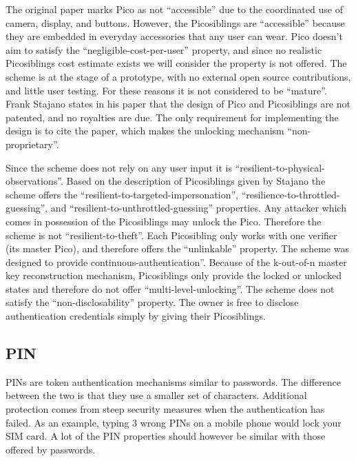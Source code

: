 	The original paper marks Pico as not ``accessible'' due to the coordinated use of camera, display, and buttons. However, the Picosiblings are ``accessible'' because they are embedded in everyday accessories that any user can wear. Pico doesn't aim to satisfy the ``negligible-cost-per-user'' property, and since no realistic Picosiblings cost estimate exists we will consider the property is not offered. The scheme is at the stage of a prototype, with no external open source contributions, and little user testing. For these reasons it is not considered to be ``mature''. Frank Stajano states in his paper \cite{stajano2011pico} that the design of Pico and Picosiblings are not patented, and no royalties are due. The only requirement for implementing the design is to cite the paper, which makes the unlocking mechanism ``non-proprietary''.
	
	Since the scheme does not rely on any user input it is ``resilient-to-physical-observations''. Based on the description of Picosiblings given by Stajano \cite{stajano2011pico} the scheme offers the ``resilient-to-targeted-impersonation'', ``resilience-to-throttled-guessing'', and ``resilient-to-unthrottled-guessing'' properties. Any attacker which comes in possession of the Picosiblings may unlock the Pico. Therefore the scheme is not ``resilient-to-theft''. Each Picosibling only works with one verifier (its master Pico), and therefore offers the ``unlinkable'' property. The scheme was designed to provide continuous-authentication''. Because of the k-out-of-n master key reconstruction mechanism, Picosiblings only provide the locked or unlocked states and therefore do not offer ``multi-level-unlocking''. The scheme does not satisfy the ``non-disclosability'' property. The owner is free to disclose authentication credentials simply by giving their Picosiblings.
	
	\subsection{PIN}
	PINs are token authentication mechanisms similar to passwords. The difference between the two is that they use a smaller set of characters. Additional protection comes from steep security measures when the authentication has failed. As an example, typing 3 wrong PINs on a mobile phone would lock your SIM card. A lot of the PIN properties should however be similar with those offered by passwords.
	

